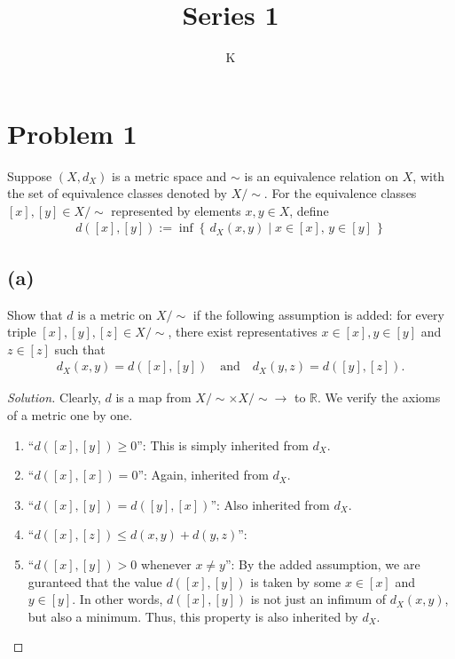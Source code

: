 \documentclass[a4paper]{article}
\title{Series 1}
\author{K}
\theoremstyle{definition}
\newcommand{\makeset}[2]{\left\{\, #1 \mid #2 \,\right\}}
\newcommand{\equivcls}[1]{%
  #1/\!{\sim}%
}
\begin{document}
\maketitle
\section*{Problem 1}
Suppose \((X, d_X)\) is a metric space and \(\sim\) is an equivalence relation on \(X\), with the set of equivalence classes denoted by \(\equivcls{X}\). For the equivalence classes \([x], [y] \in \equivcls{X}\) represented by elements \(x, y \in X\), define
\begin{align*}
    d([x], [y]) := \inf \makeset{d_X(x, y)}{x \in [x], \, y \in [y]}
\end{align*}
\subsection*{(a)}
Show that \(d\) is a metric on \(\equivcls{X}\) if the following assumption is added: for every triple \([x], [y], [z] \in \equivcls{X}\), there exist representatives \(x \in [x], y \in [y]\) and \(z \in [z]\) such that
\begin{align*}
    d_X(x, y) = d([x], [y]) \quad \text{and} \quad d_X(y, z) = d([y], [z]) \text{.}
\end{align*}
\begin{proof}[Solution]
    Clearly, \(d\) is a map from \(\equivcls{X} \times \equivcls{X} \longrightarrow\) to \(\mathbb{R}\). We verify the axioms of a metric one by one.
    \begin{enumerate}
        \item ``\(d([x], [y]) \geq 0\)'': This is simply inherited from \(d_X\).
        \item ``\(d([x], [x]) = 0\)'': Again, inherited from \(d_X\).
        \item ``\(d([x], [y]) = d([y], [x])\)'': Also inherited from \(d_X\).
        \item ``\(d([x], [z]) \leq d(x, y) + d(y, z)\)'':
        \item ``\(d([x], [y]) > 0\) whenever \(x \neq y\)'': By the added assumption, we are guranteed that the value \(d([x], [y])\) is taken by some \(x \in [x]\) and \(y \in [y]\). In other words, \(d([x], [y])\) is not just an infimum of \(d_X(x, y)\), but also a minimum. Thus, this property is also inherited by \(d_X\).
    \end{enumerate}
\end{proof}
\end{document}
